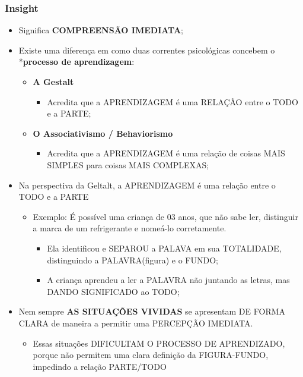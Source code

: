 \documentclass[
]{book}
\providecommand{\tightlist}{%
  \setlength{\itemsep}{0pt}\setlength{\parskip}{0pt}}
\begin{document}
\hypertarget{insight}{%
\subsubsection{Insight}\label{insight}}

\begin{itemize}
\tightlist
\item
  Significa \textbf{COMPREENSÃO IMEDIATA};
\item
  Existe uma diferença em como duas correntes psicológicas concebem o
  *\textbf{processo de aprendizagem}:

  \begin{itemize}
  \tightlist
  \item
    \textbf{A Gestalt}

    \begin{itemize}
    \tightlist
    \item
      Acredita que a APRENDIZAGEM é uma RELAÇÃO entre o TODO e a PARTE;
    \end{itemize}
  \item
    \textbf{O Associativismo / Behaviorismo}

    \begin{itemize}
    \tightlist
    \item
      Acredita que a APRENDIZAGEM é uma relação de coisas MAIS SIMPLES
      para coisas MAIS COMPLEXAS;
    \end{itemize}
  \end{itemize}
\item
  Na perspectiva da Geltalt, a APRENDIZAGEM é uma relação entre o TODO e
  a PARTE

  \begin{itemize}
  \tightlist
  \item
    Exemplo: É possível uma criança de 03 anos, que não sabe ler,
    distinguir a marca de um refrigerante e nomeá-lo corretamente.

    \begin{itemize}
    \tightlist
    \item
      Ela identificou e SEPAROU a PALAVA em sua TOTALIDADE, distinguindo
      a PALAVRA(figura) e o FUNDO;
    \item
      A criança aprendeu a ler a PALAVRA não juntando as letras, mas
      DANDO SIGNIFICADO ao TODO;
    \end{itemize}
  \end{itemize}
\item
  Nem sempre \textbf{AS SITUAÇÕES VIVIDAS} se apresentam DE FORMA CLARA
  de maneira a permitir uma PERCEPÇÃO IMEDIATA.

  \begin{itemize}
  \tightlist
  \item
    Essas situações DIFICULTAM O PROCESSO DE APRENDIZADO, porque não
    permitem uma clara definição da FIGURA-FUNDO, impedindo a relação
    PARTE/TODO
  \end{itemize}
\end{itemize}
\end{document}
